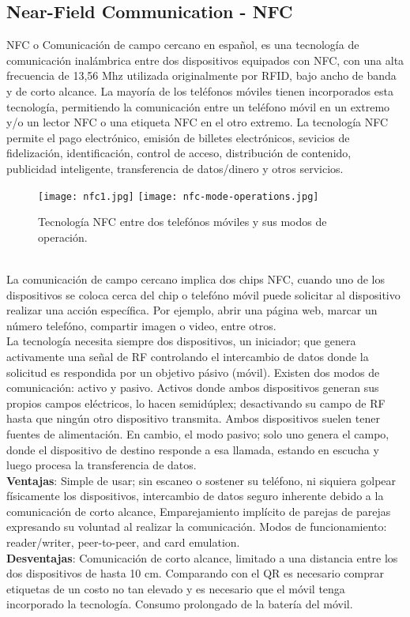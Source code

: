 \subsection{Near-Field Communication - NFC}
NFC o Comunicación de campo cercano en español, es una tecnología de comunicación inalámbrica entre dos dispositivos equipados con NFC, con una alta frecuencia de 13,56 Mhz utilizada originalmente por RFID, bajo ancho de banda y de corto alcance. La mayoría de los teléfonos móviles tienen incorporados esta tecnología, permitiendo la comunicación entre un teléfono móvil en un extremo y/o un lector NFC o una etiqueta NFC en el otro extremo.
La tecnología NFC permite el pago electrónico, emisión de billetes electrónicos, sevicios de fidelización, identificación, control de acceso, distribución de contenido, publicidad inteligente, transferencia de datos/dinero y otros servicios. \cite{2011_Coskun_BOOK}
\begin{figure} 	
	\centering
	\texttt{[image: nfc1.jpg]}
	\texttt{[image: nfc-mode-operations.jpg]}
	\caption{Tecnología NFC entre dos telefónos móviles y sus modos de operación.}
	\label{fig:nfc}
\end{figure}
\\
La comunicación de campo cercano implica dos chips NFC, cuando uno de los dispositivos se coloca cerca del chip o telefóno móvil puede solicitar al dispositivo realizar una acción específica. Por ejemplo, abrir una página web, marcar un número telefóno, compartir imagen o video, entre otros.\cite{2012_Waters_BOOK}
\\
La tecnología necesita siempre dos dispositivos, un iniciador; que genera activamente una señal de RF controlando el intercambio de datos donde la solicitud es respondida por un objetivo pásivo (móvil). Existen dos modos de comunicación: activo y pasivo. Activos donde ambos dispositivos generan sus propios campos eléctricos, lo hacen semidúplex; desactivando su campo de RF hasta que ningún otro dispositivo transmita. Ambos dispositivos suelen tener fuentes de alimentación. En cambio, el modo pasivo; solo uno genera el campo, donde el dispositivo de destino responde a esa llamada, estando en escucha y luego procesa la transferencia de datos.\cite{2012_Curran}
\\
\textbf{Ventajas}: Simple de usar; sin escaneo o sostener su teléfono, ni siquiera golpear físicamente los dispositivos, intercambio de datos seguro inherente debido a la comunicación de corto alcance, Emparejamiento implícito de parejas de parejas expresando su voluntad al realizar la comunicación. Modos de funcionamiento: reader/writer, peer-to-peer, and card emulation.\cite{2011_Coskun_BOOK}
\\
\textbf{Desventajas}: Comunicación de corto alcance, limitado a una distancia entre los dos dispositivos de hasta 10 cm.\cite{2012_Curran} Comparando con el QR es necesario comprar etiquetas de un costo no tan elevado y es necesario que el móvil tenga incorporado la tecnología.\cite{2011_Coskun_BOOK} Consumo prolongado de la batería del móvil.\cite{2012_Waters_BOOK} 


